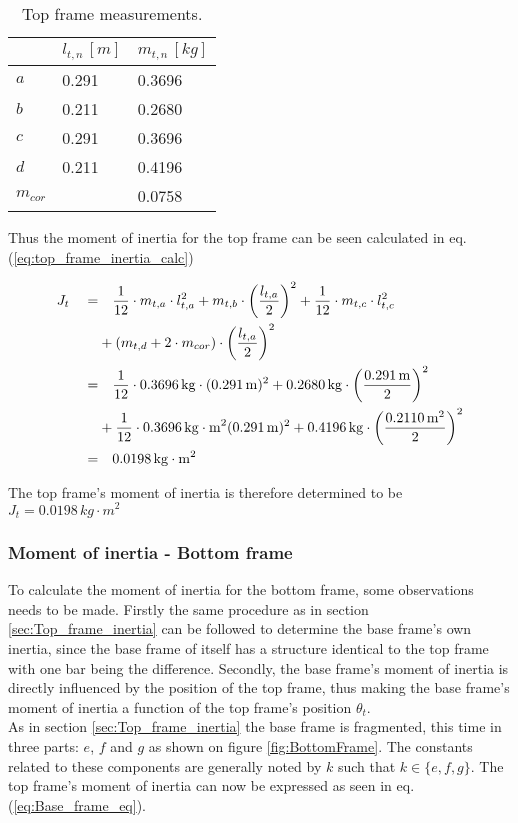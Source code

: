 \documentclass[../../main]{subfiles}
\begin{document}
\begin{table}[H]
\centering
\begin{tabular}{|l|l|l|}
\hline
  & $l_{t,n} \, \si{[m]}$ & $m_{t,n} \, \si{[kg]}$ \\
\hline
$a$ & 0.291  & 0.3696  \\
\hline
$b$ & 0.211  & 0.2680  \\
\hline
$c$ & 0.291 & 0.3696  \\
\hline
$d$ & 0.211 & 0.4196  \\
\hline
$m_{cor}$ & & 0.0758 \\
\hline
\end{tabular}
\caption{Top frame measurements.}
    \label{tab:Top_frame_table}
\end{table}

Thus the moment of inertia for the top frame can be seen calculated in eq. (\ref{eq:top_frame_inertia_calc})

\begin{equation}
  \centering
    \label{eq:top_frame_inertia_calc}
  \begin{split}
      J_t  \quad  =&  \quad \frac{1}{12} \cdot m_{t,a} \cdot l_{t,a}^2 + m_{t,b} \cdot \left(\frac{l_{t,a}}{2}\right)^2 + \frac{1}{12} \cdot m_{t,c}\cdot l_{t,c}^2\\
      &+ (m_{t,d} + 2 \cdot m_{cor}) \cdot \left( \frac{l_{t,a}}{2}\right)^2 \\
      =& \quad \frac{1}{12} \cdot 0.3696 \si{\,kg}  \cdot (0.291 \si{\,m})^2
      + 0.2680 \si{\,kg} \cdot \left(\frac{0.291 \si{\,m}}{2}\right)^2 \\
      &+ \frac{1}{12} \cdot 0.3696 \si{\,kg\cdot m^2} (0.291 \si{\,m})^2
      + 0.4196 \si{\,kg} \cdot \left( \frac{0.2110\si{\,m}^2}{2} \right)^2 \\
      =& \quad 0.0198 \si{\,kg\cdot m^2}
  \end{split}
\end{equation}

The top frame's moment of inertia is therefore determined to be
\newline $J_{t} = 0.0198 \si{\,kg\cdot m^2}$

\subsubsection{Moment of inertia - Bottom frame}
To calculate the moment of inertia for the bottom frame, some observations needs to be made. Firstly the same procedure as in section \ref{sec:Top_frame_inertia} can be followed to determine the base frame's own inertia, since the base frame of itself has a structure identical to the top frame with one bar being the difference. Secondly, the base frame's moment of inertia is directly influenced by the position of the top frame, thus making the base frame's moment of inertia a function of the top frame's position $\theta_t$.\\
As in section \ref{sec:Top_frame_inertia} the base frame is fragmented, this time in three parts: $e$, $f$ and $g$ as shown on figure \ref{fig:BottomFrame}. The constants related to these components are generally noted by $k$ such that $k \in \{e,f,g\}$. The top frame's moment of inertia can now be expressed as seen in eq. (\ref{eq:Base_frame_eq}).
\end{document}
